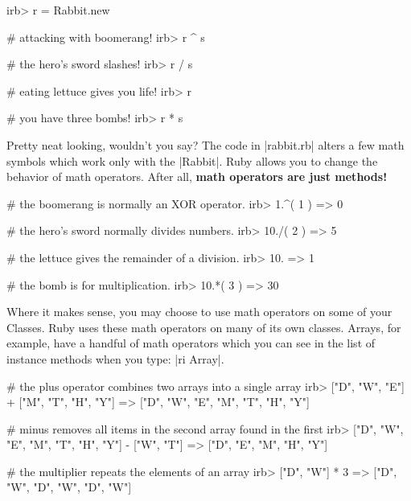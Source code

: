 \documentclass[12pt,twoside]{report}
\begin{document}
\begin{consolecode}

 irb> r = Rabbit.new

 # attacking with boomerang!
 irb> r ^ s

 # the hero's sword slashes!
 irb> r / s

 # eating lettuce gives you life!
 irb> r %

 # you have three bombs!
 irb> r * s

\end{consolecode}


Pretty neat looking, wouldn't you say?  The code in
\rubyinline|rabbit.rb| alters a few math symbols which
work only with the \rubyinline|Rabbit|.  Ruby allows
you to change the behavior of math operators.  After all, {\bf math
  operators are just methods!}


\begin{consolecode}

 # the boomerang is normally an XOR operator.
 irb> 1.^( 1 )
   => 0

 # the hero's sword normally divides numbers.
 irb> 10./( 2 )
   => 5

 # the lettuce gives the remainder of a division.
 irb> 10.%
   => 1

 # the bomb is for multiplication.
 irb> 10.*( 3 )
   => 30

\end{consolecode}


Where it makes sense, you may choose to use math operators on some of
your Classes.  Ruby uses these math operators on many of its own
classes.  Arrays, for example, have a handful of math operators which
you can see in the list of instance methods when you type:
\rubyinline|ri Array|.


\begin{consolecode}

 # the plus operator combines two arrays into a single array
 irb> ["D", "W", "E"] + ["M", "T", "H", "Y"]
   => ["D", "W", "E", "M", "T", "H", "Y"]

 # minus removes all items in the second array found in the first
 irb> ["D", "W", "E", "M", "T", "H", "Y"] - ["W", "T"]
   => ["D", "E", "M", "H", "Y"]

 # the multiplier repeats the elements of an array
 irb> ["D", "W"] * 3
   => ["D", "W", "D", "W", "D", "W"]

\end{consolecode}
\end{document}
